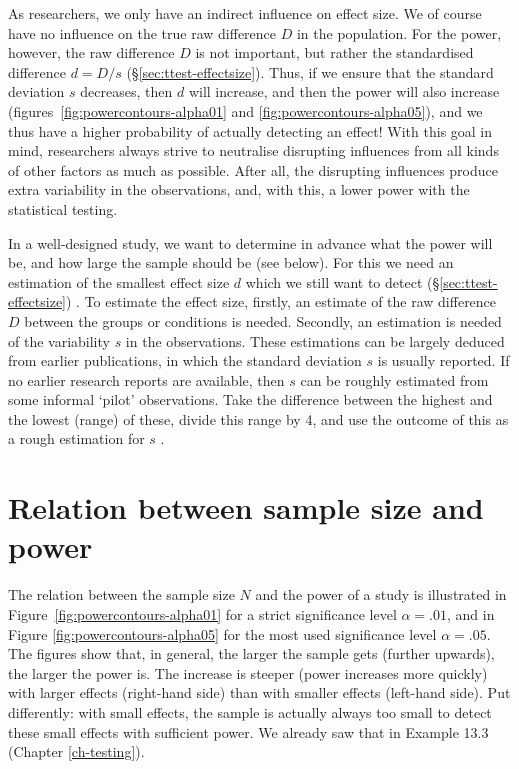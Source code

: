 \documentclass[
]{book}
\begin{document}
As researchers, we only have an indirect influence on effect size.
We of course have no influence on the true raw difference \(D\) in the
population. For the power, however, the raw difference \(D\) is not
important, but rather the standardised difference \(d=D/s\)
(§\ref{sec:ttest-effectsize}). Thus, if we ensure that the standard
deviation \(s\) decreases, then \(d\) will increase,
and then the power will also increase
(figures~\ref{fig:powercontours-alpha01} and \ref{fig:powercontours-alpha05}),
and we thus have a higher probability
of actually detecting an effect!
With this goal in mind, researchers always strive to neutralise
disrupting influences from all kinds of other factors as much as possible.
After all, the disrupting influences produce extra variability in the observations, and,
with this, a lower power with the statistical testing.

In a well-designed study, we want to determine in advance what
the power will be, and how large the sample should be (see below).
For this we need an estimation of the smallest effect size \(d\)
which we still want to detect
(§\ref{sec:ttest-effectsize}) \citep{Quene10}. To estimate the effect size, firstly,
an estimate of the raw difference \(D\) between the groups or conditions is needed.
Secondly, an estimation is needed of the variability \(s\)
in the observations. These estimations can be largely deduced from
earlier publications, in which the standard deviation
\(s\) is usually reported. If no earlier research reports are available,
then \(s\) can be roughly estimated from some informal
`pilot' observations. Take the difference between the highest and the lowest
(range) of these, divide this range by 4, and use the outcome of this as
a rough estimation for \(s\) \citep{PD08}.

\section{Relation between sample size and power}\label{sec:samplesize-power}

The relation between the sample size \(N\) and the power of a study
is illustrated in
Figure~\ref{fig:powercontours-alpha01} for a strict significance
level \(\alpha=.01\), and in
Figure \ref{fig:powercontours-alpha05} for the most used
significance level \(\alpha=.05\). The figures show that, in general, the larger the
sample gets (further upwards), the larger the power is.
The increase is steeper (power increases more quickly) with larger
effects (right-hand side) than with smaller effects (left-hand side). Put differently:
with small effects, the sample is actually always too small to detect
these small effects with sufficient power. We already saw that in
Example 13.3 (Chapter \ref{ch-testing}).
\end{document}
